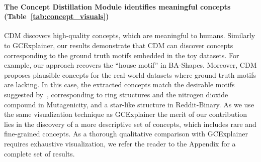 \documentclass[withindex,glossary]{cam-thesis}
\theoremstyle{plain}
\theoremstyle{definition}
\theoremstyle{remark}
\begin{document}
\paragraph{The Concept Distillation Module identifies meaningful concepts (Table~\ref{tab:concept_visuals})}
CDM discovers high-quality concepts, which are meaningful to humans. Similarly to GCExplainer, our results demonstrate that CDM can discover concepts corresponding to the ground truth motifs embedded in the toy datasets. For example, our approach recovers the ``house motif'' in BA-Shapes. Moreover, CDM proposes plausible concepts for the real-world datasets where ground truth motifs are lacking. In this case, the extracted concepts match the desirable motifs suggested by~\citet{ying2019gnnexplainer}, corresponding to ring structures and the nitrogen dioxide compound in Mutagenicity, and a star-like structure in Reddit-Binary. 
As we use the same visualization technique as GCExplainer the merit of our contribution lies in the discovery of a more descriptive set of concepts, which includes rare and fine-grained concepts. As a thorough qualitative comparison with GCExplainer requires exhaustive visualization, we refer the reader to the Appendix for a complete set of results.




\end{document}
